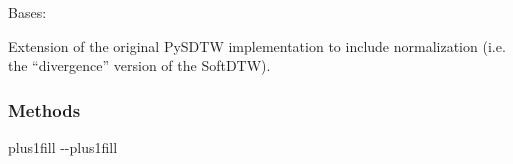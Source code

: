\documentclass[letterpaper,10pt,english]{sphinxmanual}
\begin{document}
\begin{fulllineitems}
\label{\detokenize{dtw_loss_functions.soft_dtw_implementations.pysdtw_normalize:dtw_loss_functions.soft_dtw_implementations.pysdtw_normalize.pysdtw_normalized}}
\pysigstartsignatures
\pysiglinewithargsret
{}
{\sphinxparamcomma {}\sphinxparamcomma {}\sphinxparamcomma {}}
{}
\pysigstopsignatures
\sphinxAtStartPar
Bases: 

\sphinxAtStartPar
Extension of the original PySDTW implementation to include normalization (i.e. the “divergence” version of the SoftDTW).
\subsubsection*{Methods}


\begin{savenotes}
\sphinxatlongtablestart
\sphinxthistablewithglobalstyle
\sphinxthistablewithnovlinesstyle
\makeatletter
  \LTleft \@totalleftmargin plus1fill
  \LTright\dimexpr\columnwidth-\@totalleftmargin-\linewidth\relax plus1fill
\makeatother
\begin{longtable}{}
\sphinxtoprule
\endfirsthead

\\
\sphinxtoprule
\endhead

\sphinxbottomrule
{}\\
\endfoot


\end{longtable}
\end{savenotes}
\end{fulllineitems}
\end{document}
